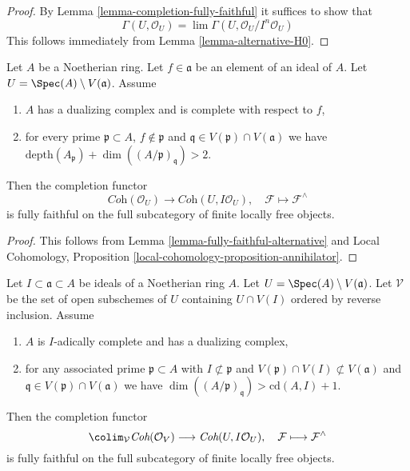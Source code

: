 \begin{proof}
By Lemma \ref{lemma-completion-fully-faithful}
it suffices to show that
$$
\Gamma(U, \mathcal{O}_U) =
\lim \Gamma(U, \mathcal{O}_U/I^n\mathcal{O}_U)
$$
This follows immediately from
Lemma \ref{lemma-alternative-H0}.
\end{proof}

\begin{lemma}
\label{lemma-fully-faithful-simple-two}
Let $A$ be a Noetherian ring. Let $f \in \mathfrak a$ be an element of
an ideal of $A$. Let $U = \Spec(A) \setminus V(\mathfrak a)$. Assume
\begin{enumerate}
\item $A$ has a dualizing complex and is complete with respect to $f$,
\item for every prime $\mathfrak p \subset A$, $f \not \in \mathfrak p$
and $\mathfrak q \in V(\mathfrak p) \cap V(\mathfrak a)$ we have
$\text{depth}(A_\mathfrak p) + \dim((A/\mathfrak p)_\mathfrak q) > 2$.
\end{enumerate}
Then the completion functor
$$
\textit{Coh}(\mathcal{O}_U)
\longrightarrow
\textit{Coh}(U, I\mathcal{O}_U),
\quad
\mathcal{F} \longmapsto \mathcal{F}^\wedge
$$
is fully faithful on the full subcategory of finite locally free objects.
\end{lemma}

\begin{proof}
This follows from Lemma \ref{lemma-fully-faithful-alternative} and
Local Cohomology, Proposition \ref{local-cohomology-proposition-annihilator}.
\end{proof}

\begin{lemma}
\label{lemma-fully-faithful-general}
Let $I \subset \mathfrak a \subset A$ be ideals of a Noetherian ring $A$.
Let $U = \Spec(A) \setminus V(\mathfrak a)$. Let $\mathcal{V}$ be
the set of open subschemes of $U$ containing $U \cap V(I)$
ordered by reverse inclusion. Assume
\begin{enumerate}
\item $A$ is $I$-adically complete and has a dualizing complex,
\item for any associated prime
$\mathfrak p \subset A$ with
$I \not \subset \mathfrak p$ and
$V(\mathfrak p) \cap V(I) \not \subset V(\mathfrak a)$
and $\mathfrak q \in V(\mathfrak p) \cap V(\mathfrak a)$ we have
$\dim((A/\mathfrak p)_\mathfrak q) > \text{cd}(A, I) + 1$.
\end{enumerate}
Then the completion functor
$$
\colim_\mathcal{V} \textit{Coh}(\mathcal{O}_V)
\longrightarrow
\textit{Coh}(U, I\mathcal{O}_U),
\quad
\mathcal{F} \longmapsto \mathcal{F}^\wedge
$$
is fully faithful on the full subcategory of
finite locally free objects.
\end{lemma}

